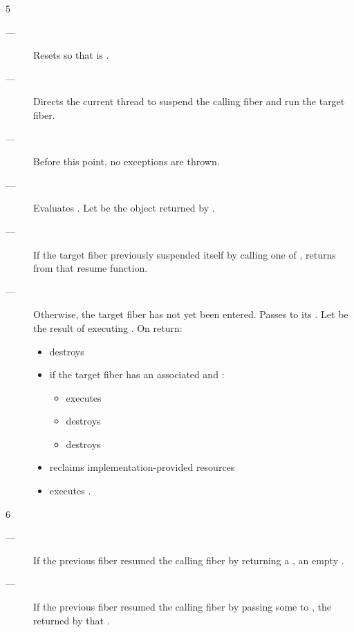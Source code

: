 5 \effects
\begin{description}
    \item[---] Resets \state so that \emptyfn is \true.
    \item[---] Directs the current thread to suspend the calling fiber and run
               the target fiber.
    \item[---] Before this point, no exceptions are thrown.
    \item[---] Evaluates .
               Let  be the \fiber object returned by .
    \item[---] If the target fiber previously suspended itself by calling one
               of \anyresume, returns  from that resume function.
    \item[---] Otherwise, the target fiber has not yet been entered.
               Passes  to its \entryfn.
               Let  be the result of executing
               . On return:
        \begin{itemize}
            \item destroys 
            \item if the target fiber has an associated  and :
                \begin{itemize}
                    \item executes 
                    \item destroys 
                    \item destroys 
                \end{itemize}
            \item reclaims implementation-provided resources
            \item executes \resume[successor].
        \end{itemize}
\end{description}

6 \returns
\begin{description}
    \item[---] If the previous fiber resumed the calling fiber by returning a \fiber,
               an empty \fiber.
    \item[---] If the previous fiber resumed the calling fiber by passing some 
               to \anyresumewith, the \fiber returned by that .
\end{description}

